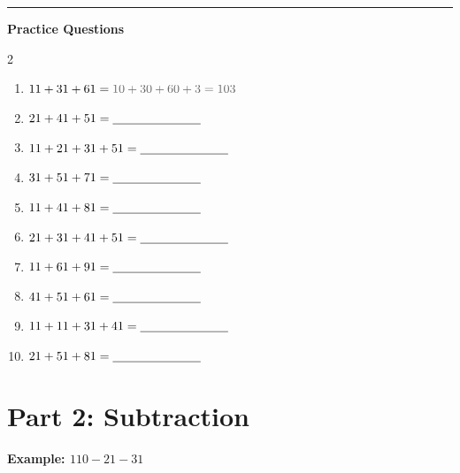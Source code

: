 \documentclass{article}
\begin{document}
\vspace{1em}
\noindent\textcolor{subtext!40}{\rule{\linewidth}{0.5pt}}
\vspace{1.5em}

\begingroup
\parindent=0pt
{\Large \textbf{Practice Questions}}\par\vspace{0.4em}
\endgroup
\vspace{1em}

\begin{multicols}{2}
\begin{enumerate}[label=\textbf{\arabic*.}, itemsep=1.8em, leftmargin=2em]
  \item $11 + 31 + 61 = {\color{subtext}10 + 30 + 60 + 3 = 103}$
  \item $21 + 41 + 51 = \underline{\hspace{2.5cm}}$
  \item $11 + 21 + 31 + 51 = \underline{\hspace{2.5cm}}$
  \item $31 + 51 + 71 = \underline{\hspace{2.5cm}}$
  \item $11 + 41 + 81 = \underline{\hspace{2.5cm}}$
  \item $21 + 31 + 41 + 51 = \underline{\hspace{2.5cm}}$
  \item $11 + 61 + 91 = \underline{\hspace{2.5cm}}$
  \item $41 + 51 + 61 = \underline{\hspace{2.5cm}}$
  \item $11 + 11 + 31 + 41 = \underline{\hspace{2.5cm}}$
  \item $21 + 51 + 81 = \underline{\hspace{2.5cm}}$
\end{enumerate}
\end{multicols}

\section*{Part 2: Subtraction}
{\Large \textbf{Example: $110 - 21 - 31$}}
\vspace{0.5em}
\end{document}
